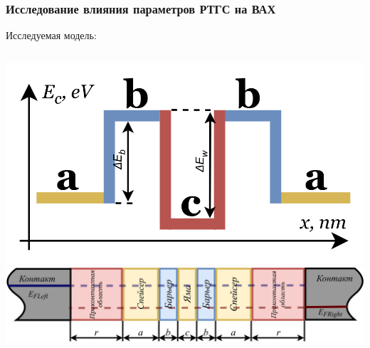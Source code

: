 \documentclass[10pt,pdf,hyperref={unicode},aspectratio={169}]{beamer}
\begin{document}
\begin{frame}
	\frametitle{Исследование влияния параметров РТГС на ВАХ}
	{\color{blue} Исследуемая модель:}
	\begin{columns}
	   	\includegraphics[width=\linewidth]{assets/BD}
	   	\includegraphics[width=\linewidth]{assets/RTHS}
	\end{columns}


\end{frame}
\end{document}
